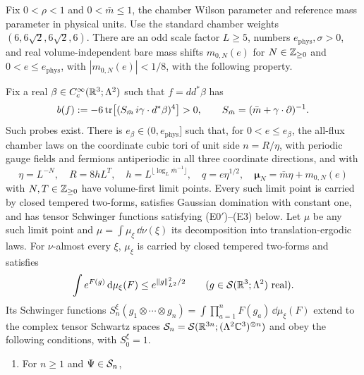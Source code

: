 \begin{theorem}\label{thm:main}
Fix $0<\rho<1$ and $0<\bar m\le1$, the chamber Wilson parameter and
reference mass parameter in physical units. Use the standard chamber weights
$(6,6\sqrt2,6\sqrt2,6)$. There are an odd scale factor $L\ge5$,
numbers $e_{\mathrm{phys}},\sigma>0$, and real volume-independent bare mass shifts
$m_{0,N}(e)$ for $N\in\mathbb Z_{\ge0}$ and $0<e\le e_{\mathrm{phys}}$, with
$|m_{0,N}(e)|<1/8$, with the following property.

Fix a real $\beta\in C_c^\infty(\mathbb R^3;\Lambda^2)$ such that
$f=dd^*\beta$ has
\begin{equation}\label{eq:positive-coefficient}
 b(f):=-6\operatorname{tr}\bigl[(S_{\bar m}\,i\gamma\cdot d^*\beta)^4\bigr]>0,
 \qquad S_{\bar m}=(\bar m+\gamma\cdot\partial)^{-1}.
\end{equation}
Such probes exist. There is $e_\beta\in(0,e_{\mathrm{phys}}]$ such that, for $0<e\le e_\beta$,
the all-flux chamber laws on the coordinate cubic tori of unit
side $n=R/\eta$, with periodic gauge fields and fermions
antiperiodic in all three coordinate directions, and with
\begin{equation}\label{eq:cutoff-scales}
 \eta=L^{-N},\quad R=8hL^T,\quad
 h=L^{\lfloor\log_L\bar m^{-1}\rfloor},\quad
 q=e\eta^{1/2},\quad \boldsymbol\mu_N=\bar m\eta+m_{0,N}(e)
\end{equation}
with $N,T\in\mathbb Z_{\ge0}$ have volume-first limit points.
Every such limit point is carried by closed tempered two-forms,
satisfies Gaussian domination with constant one, and has tensor
Schwinger functions satisfying \textup{(E0$'$)}--\textup{(E3)} below.
Let $\mu$ be any such limit point and
$\mu=\int\mu_\xi\,\dd\nu(\xi)$ its decomposition into
translation-ergodic laws. For $\nu$-almost every $\xi$, $\mu_\xi$ is
carried by closed tempered two-forms and satisfies
\begin{equation}\label{eq:main-domination}
 \int e^{F(g)}\,\mathrm d\mu_\xi(F)\le e^{\|g\|_{L^2}^2/2}
 \qquad(g\in\mathcal S(\mathbb R^3;\Lambda^2)\text{ real}).
\end{equation}
Its Schwinger functions
$S_n^\xi(g_1\otimes\cdots\otimes g_n)
=\int\prod_{a=1}^nF(g_a)\,\dd\mu_\xi(F)$
extend to the complex tensor Schwartz spaces
$\mathcal S_n=\mathcal S(\mathbb R^{3n};(\Lambda^2\mathbb C^3)^{\otimes n})$
and obey the following conditions, with $S_0^\xi=1$.
\begin{enumerate}
\item[\textup{(E0$'$)}] For $n\ge1$ and $\Psi\in\mathcal S_n$,
\begin{equation}\label{eq:main-growth}

\end{equation}
\end{enumerate}
\end{theorem}
